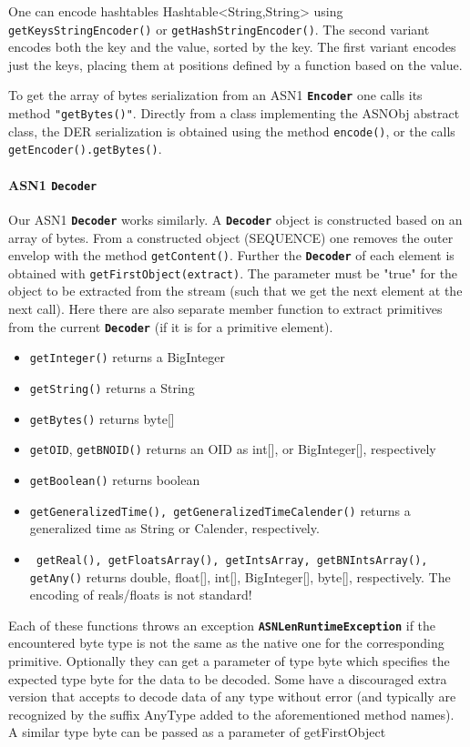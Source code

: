 \documentclass{book}
\newcommand{\cls}[1]{{\tt\bf #1}}
\newcommand{\mth}[1]{{\tt #1}}
\begin{document}
One can encode hashtables Hashtable<String,String> using \mth{getKeysStringEncoder()} or \mth{getHashStringEncoder()}.
The second variant encodes both the key and the value, sorted by the key. The first variant encodes just the keys,
placing them at positions defined by a function based on the value.

To get the array of bytes serialization from an ASN1 \cls{Encoder} one calls its method \mth{"getBytes()"}.
Directly from a class implementing the ASNObj abstract class, the DER serialization is obtained using
the method \mth{encode()}, or the calls \mth{getEncoder().getBytes()}.

\paragraph{ASN1 \cls{Decoder}}
Our ASN1 \cls{Decoder} works similarly. A \cls{Decoder} object is constructed based on an array of bytes. From a constructed object (SEQUENCE)
one removes the outer envelop with the method \mth{getContent()}.
Further the \cls{Decoder} of each element is obtained with \mth{getFirstObject(extract)}. The parameter must be "true" for the object to be extracted from the stream (such that we get the next element at the next call).
Here there are also separate member function to extract primitives from the current \cls{Decoder} (if it is for a primitive element).
\begin{itemize}
\item
\mth{getInteger()} returns a BigInteger
\item
\mth{getString()} returns a String
\item
\mth{getBytes()} returns byte[]
\item
\mth{getOID}, \mth{getBNOID()} returns an OID as int[], or BigInteger[], respectively
\item
\mth{getBoolean()} returns boolean
\item
\mth{getGeneralizedTime(), getGeneralizedTimeCalender()} returns a generalized time as String or Calender, respectively.
\item
\mth{ getReal(), getFloatsArray(), getIntsArray, getBNIntsArray(), getAny()} returns double, float[], int[], BigInteger[], byte[], respectively.
The encoding of reals/floats is not standard!
\end{itemize}
Each of these functions throws an exception \cls{ASNLenRuntimeException} if the encountered byte type is not the same as the native one
for the corresponding primitive. Optionally they can get a parameter of type byte which specifies the expected type byte 
for the data to be decoded. Some have a discouraged extra version that accepts to decode data of any type without error (and
typically are recognized by the suffix AnyType added to the aforementioned method names). A similar type byte can be
passed as a parameter of getFirstObject
\end{document}
